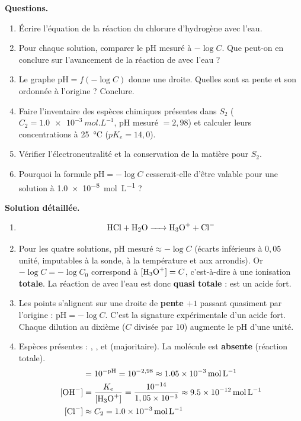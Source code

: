 \documentclass[11pt]{article}
\newcommand{\cle}[1]{{\popxbold\color{popdark}#1}}
\begin{document}
\begin{exoresolu}
\textbf{Questions.}
\begin{enumerate}
\item Écrire l'équation de la réaction du chlorure d'hydrogène  avec l'eau.
\item Pour chaque solution, comparer le pH mesuré à $-\log C$. Que peut-on en conclure sur l'avancement de la réaction de  avec l'eau ?
\item Le graphe $\text{pH} = f(-\log C)$ donne une droite. Quelles sont sa pente et son ordonnée à l'origine ? Conclure.
\item Faire l'inventaire des espèces chimiques présentes dans $S_2$ ($C_2 = \SI{1,0e-3}{mol.L^{-1}}$, pH mesuré $= 2,98$) et calculer leurs concentrations à \SI{25}{\celsius} ($pK_e = 14,0$).
\item Vérifier l'électroneutralité et la conservation de la matière pour $S_2$.
\item Pourquoi la formule $\text{pH} = -\log C$ cesserait-elle d'être valable pour une solution à \SI{1,0e-8}{mol.L^{-1}} ?
\end{enumerate}
\tcblower
\textbf{Solution détaillée.}
\begin{enumerate}
\item \[ \ce{HCl + H2O -> H3O+ + Cl-} \]
\item Pour les quatre solutions, $\text{pH mesuré} \approx -\log C$ (écarts inférieurs à $0,05$ unité, imputables à la sonde, à la température et aux arrondis). Or $-\log C = -\log C_0$ correspond à $[\ce{H3O+}] = C$, c'est-à-dire à une ionisation \textbf{totale}. La réaction de  avec l'eau est donc \textbf{quasi totale} :  est un \cle{acide fort}.
\item Les points s'alignent sur une droite de \textbf{pente $+1$} passant quasiment par l'origine : $\text{pH} = -\log C$. C'est la signature expérimentale d'un acide fort. Chaque dilution au dixième ($C$ divisée par 10) augmente le pH d'une unité.
\item Espèces présentes : , ,  et  (majoritaire). La molécule  est \textbf{absente} (réaction totale).
\begin{align*}
[\ce{H3O+}] &= 10^{-\text{pH}} = 10^{-2,98} \approx \SI{1,05e-3}{mol.L^{-1}}\\
[\ce{OH-}] &= \frac{K_e}{[\ce{H3O+}]} = \frac{10^{-14}}{1,05\times 10^{-3}} \approx \SI{9,5e-12}{mol.L^{-1}}\\
[\ce{Cl-}] &\approx C_2 = \SI{1,0e-3}{mol.L^{-1}}

\end{align*}
\end{enumerate}
\end{exoresolu}
\end{document}
